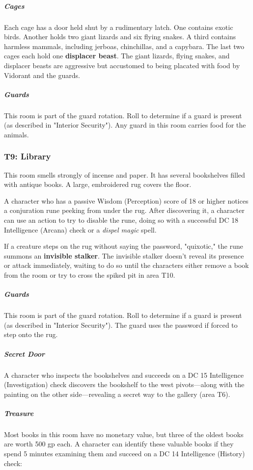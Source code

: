 \documentclass[10pt,a4paper,twoside,bg=print,twocolumn,openany,nodeprecatedcode]{dndbook}
\begin{document}
\subparagraph{Cages}
Each cage has a door held shut by a rudimentary latch. One contains exotic birds. Another holds two giant lizards and six flying snakes. A third contains harmless mammals, including jerboas, chinchillas, and a capybara. The last two cages each hold one \textbf{displacer beast}. The giant lizards, flying snakes, and displacer beasts are aggressive but accustomed to being placated with food by Vidorant and the guards.

\subparagraph{Guards}
This room is part of the guard rotation. Roll to determine if a guard is present (as described in "Interior Security"). Any guard in this room carries food for the animals.

\subsubsection{T9: Library}
\begin{DndReadAloud}{}
This room smells strongly of incense and paper. It has several bookshelves filled with antique books. A large, embroidered rug covers the floor.

\end{DndReadAloud}

A character who has a passive Wisdom (Perception) score of 18 or higher notices a conjuration rune peeking from under the rug. After discovering it, a character can use an action to try to disable the rune, doing so with a successful DC 18 Intelligence (Arcana) check or a \textit{dispel magic} spell.

If a creature steps on the rug without saying the password, "quixotic," the rune summons an \textbf{invisible stalker}. The invisible stalker doesn't reveal its presence or attack immediately, waiting to do so until the characters either remove a book from the room or try to cross the spiked pit in area T10.

\subparagraph{Guards}
This room is part of the guard rotation. Roll to determine if a guard is present (as described in "Interior Security"). The guard uses the password if forced to step onto the rug.

\subparagraph{Secret Door}
A character who inspects the bookshelves and succeeds on a DC 15 Intelligence (Investigation) check discovers the bookshelf to the west pivots—along with the painting on the other side—revealing a secret way to the gallery (area T6).

\subparagraph{Treasure}
Most books in this room have no monetary value, but three of the oldest books are worth 500 gp each. A character can identify these valuable books if they spend 5 minutes examining them and succeed on a DC 14 Intelligence (History) check:
\end{document}
